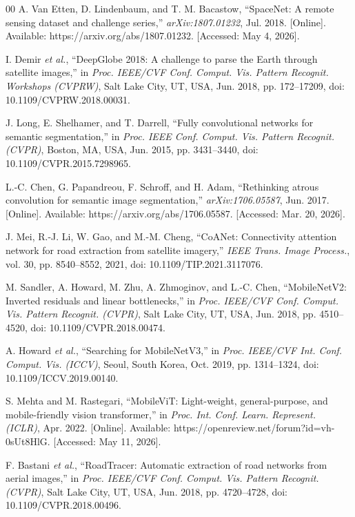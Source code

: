 \documentclass{ieeeaccess}
\begin{document}
\begin{thebibliography}{00}
A. Van Etten, D. Lindenbaum, and T. M. Bacastow, ``SpaceNet: A remote sensing dataset and challenge series,'' \emph{arXiv:1807.01232}, Jul. 2018. [Online]. Available: https://arxiv.org/abs/1807.01232. [Accessed: May 4, 2026].

I. Demir \emph{et al.}, ``DeepGlobe 2018: A challenge to parse the Earth through satellite images,'' in \emph{Proc. IEEE/CVF Conf. Comput. Vis. Pattern Recognit. Workshops (CVPRW)}, Salt Lake City, UT, USA, Jun. 2018, pp. 172--17209, doi: 10.1109/CVPRW.2018.00031.

J. Long, E. Shelhamer, and T. Darrell, ``Fully convolutional networks for semantic segmentation,'' in \emph{Proc. IEEE Conf. Comput. Vis. Pattern Recognit. (CVPR)}, Boston, MA, USA, Jun. 2015, pp. 3431--3440, doi: 10.1109/CVPR.2015.7298965.

L.-C. Chen, G. Papandreou, F. Schroff, and H. Adam, ``Rethinking atrous convolution for semantic image segmentation,'' \emph{arXiv:1706.05587}, Jun. 2017. [Online]. Available: https://arxiv.org/abs/1706.05587. [Accessed: Mar. 20, 2026].

J. Mei, R.-J. Li, W. Gao, and M.-M. Cheng, ``CoANet: Connectivity attention network for road extraction from satellite imagery,'' \emph{IEEE Trans. Image Process.}, vol. 30, pp. 8540--8552, 2021, doi: 10.1109/TIP.2021.3117076.

M. Sandler, A. Howard, M. Zhu, A. Zhmoginov, and L.-C. Chen, ``MobileNetV2: Inverted residuals and linear bottlenecks,'' in \emph{Proc. IEEE/CVF Conf. Comput. Vis. Pattern Recognit. (CVPR)}, Salt Lake City, UT, USA, Jun. 2018, pp. 4510--4520, doi: 10.1109/CVPR.2018.00474.

A. Howard \emph{et al.}, ``Searching for MobileNetV3,'' in \emph{Proc. IEEE/CVF Int. Conf. Comput. Vis. (ICCV)}, Seoul, South Korea, Oct. 2019, pp. 1314--1324, doi: 10.1109/ICCV.2019.00140.

S. Mehta and M. Rastegari, ``MobileViT: Light-weight, general-purpose, and mobile-friendly vision transformer,'' in \emph{Proc. Int. Conf. Learn. Represent. (ICLR)}, Apr. 2022. [Online]. Available: https://openreview.net/forum?id=vh-0sUt8HlG. [Accessed: May 11, 2026].

F. Bastani \emph{et al.}, ``RoadTracer: Automatic extraction of road networks from aerial images,'' in \emph{Proc. IEEE/CVF Conf. Comput. Vis. Pattern Recognit. (CVPR)}, Salt Lake City, UT, USA, Jun. 2018, pp. 4720--4728, doi: 10.1109/CVPR.2018.00496.


\end{thebibliography}
\end{document}
